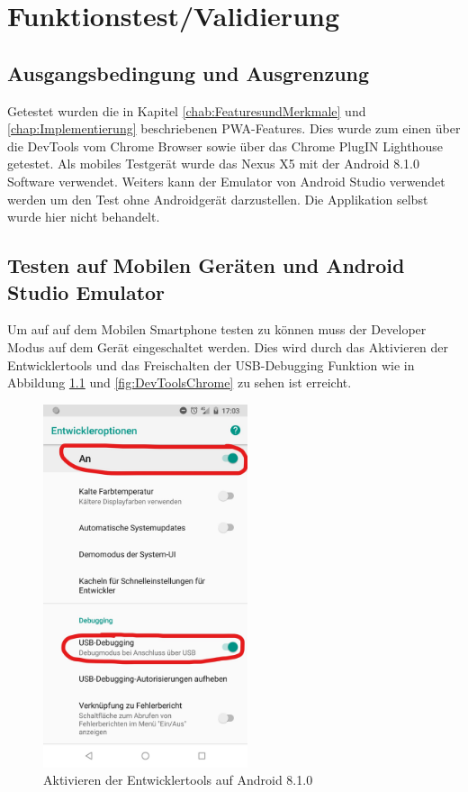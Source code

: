 \chapter{Funktionstest/Validierung}\label{chap:Funktionstest}
\thispagestyle{standard}
\pagestyle{standard}

\section{Ausgangsbedingung und Ausgrenzung}
Getestet wurden die in Kapitel \ref{chab:FeaturesundMerkmale} und \ref{chap:Implementierung} beschriebenen PWA-Features. Dies wurde zum einen über die DevTools vom Chrome Browser sowie über das Chrome PlugIN Lighthouse getestet. 
Als mobiles Testgerät wurde das Nexus X5 mit der Android 8.1.0 Software verwendet.  
Weiters kann der Emulator von Android Studio verwendet werden um den Test ohne Androidgerät darzustellen. Die Applikation selbst wurde hier nicht behandelt.
 
\section{Testen auf Mobilen Geräten und Android Studio Emulator}
Um auf auf dem Mobilen Smartphone testen zu können muss der Developer Modus auf dem Gerät eingeschaltet werden. Dies wird durch das Aktivieren der Entwicklertools und das Freischalten der USB-Debugging Funktion wie in Abbildung \ref{fig:DevToolsAndorid} und \ref{fig:DevToolsChrome} zu sehen ist erreicht. 

\begin{figure}[h]
	\centering
	\includegraphics[width=6cm]{BilderAllgemein/DevToolsAndroid}\medskip
	\caption{Aktivieren der Entwicklertools auf Android 8.1.0}
	\label{fig:DevToolsAndorid}
\end{figure}

